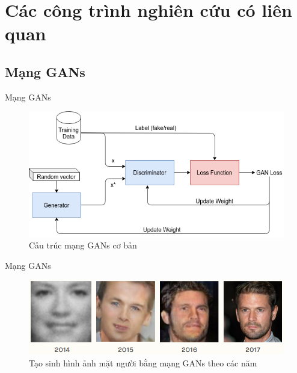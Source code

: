 \section{Các công trình nghiên cứu có liên quan}\label{sec:related_works}
\frame{\tableofcontents[currentsection]}

\subsection{Mạng GANs}
\begin{frame}{Mạng GANs}
\begin{figure}[H]
    \centering
    \includegraphics[width=12cm]{./images/gans-pure.png}
    \caption{Cấu trúc mạng GANs cơ bản}
    \label{fig:pure-gans}
\end{figure}
\end{frame}

\begin{frame}{Mạng GANs}
\begin{figure}[H]
    \centering
    \includegraphics[width=14cm]{./images/gans-faces.png}
    \caption{Tạo sinh hình ảnh mặt người bằng mạng GANs theo các năm}
    \label{fig:gans-faces}
\end{figure}
\end{frame}

